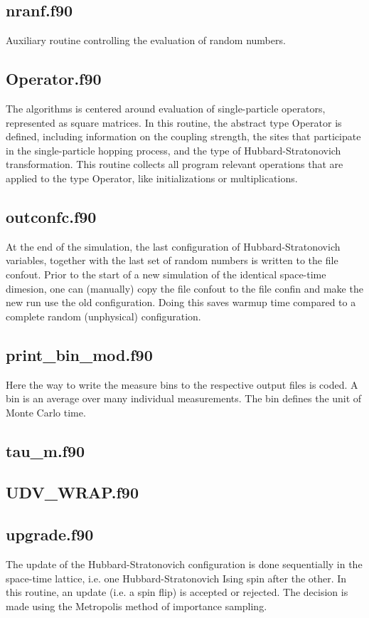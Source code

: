 \subsection{nranf.f90}
Auxiliary routine controlling the evaluation of random numbers. 
\subsection{Operator.f90}
The algorithms is centered around evaluation of single-particle operators, represented as square matrices. 
In this routine, the abstract type Operator is defined, including information on the coupling strength, the sites that participate in the single-particle hopping process, and the type of Hubbard-Stratonovich transformation. 
This routine collects all program relevant operations that are applied to the type Operator, like initializations or multiplications.
\subsection{outconfc.f90}
At the end of the simulation, the last configuration of Hubbard-Stratonovich variables, together with the last set of random numbers  is written to the file confout. 
Prior to the start of a new simulation of the identical space-time dimesion, one can (manually) copy the file confout to the file confin and make the new run use the old configuration. 
Doing this saves warmup time compared to a complete random (unphysical) configuration.
\subsection{print\_bin\_mod.f90}
Here the way to write the measure bins to the respective output files is coded.
A bin is an average over many individual measurements. The bin defines the unit of Monte Carlo time.
\subsection{tau\_m.f90}
\subsection{UDV\_WRAP.f90}
\subsection{upgrade.f90}
The update of the Hubbard-Stratonovich configuration is done sequentially in the space-time lattice, i.e. one Hubbard-Stratonovich Ising spin after the other. 
In this routine, an update (i.e. a spin flip) is accepted or rejected. The decision is made using the Metropolis method of importance sampling.

